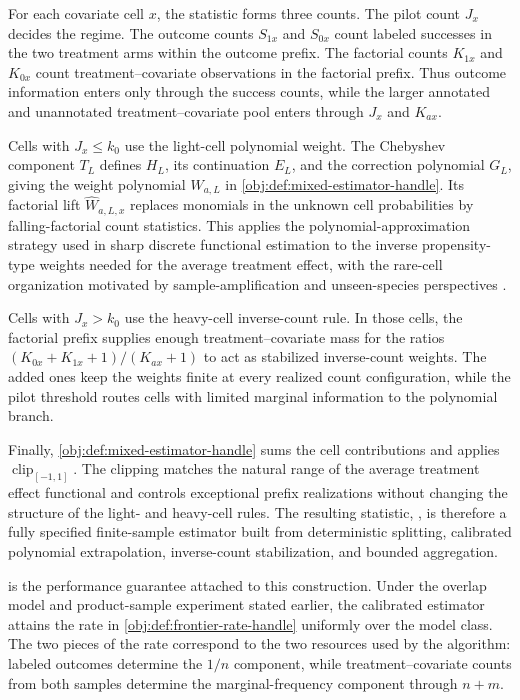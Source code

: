 For each covariate cell \(x\), the statistic forms three counts. The pilot count \(J_x\) decides the regime. The outcome counts \(S_{1x}\) and \(S_{0x}\) count labeled successes in the two treatment arms within the outcome prefix. The factorial counts \(K_{1x}\) and \(K_{0x}\) count treatment--covariate observations in the factorial prefix. Thus outcome information enters only through the success counts, while the larger annotated and unannotated treatment--covariate pool enters through \(J_x\) and \(K_{ax}\).

Cells with \(J_x\le k_0\) use the light-cell polynomial weight. The Chebyshev component \(T_L\) defines \(H_L\), its continuation \(E_L\), and the correction polynomial \(G_L\), giving the weight polynomial \(W_{a,L}\) in \cref{obj:def:mixed-estimator-handle}. Its factorial lift \(\widehat W_{a,L,x}\) replaces monomials in the unknown cell probabilities by falling-factorial count statistics. This applies the polynomial-approximation strategy used in sharp discrete functional estimation \citep{JiaoVenkatHanWeissman2015,WuYang2016} to the inverse propensity-type weights needed for the average treatment effect, with the rare-cell organization motivated by sample-amplification and unseen-species perspectives \citep{ValiantValiant2017,OrlitskySureshWu2016}.

Cells with \(J_x>k_0\) use the heavy-cell inverse-count rule. In those cells, the factorial prefix supplies enough treatment--covariate mass for the ratios \((K_{0x}+K_{1x}+1)/(K_{ax}+1)\) to act as stabilized inverse-count weights. The added ones keep the weights finite at every realized count configuration, while the pilot threshold routes cells with limited marginal information to the polynomial branch.

Finally, \cref{obj:def:mixed-estimator-handle} sums the cell contributions and applies \(\operatorname{clip}_{[-1,1]}\). The clipping matches the natural range of the average treatment effect functional and controls exceptional prefix realizations without changing the structure of the light- and heavy-cell rules. The resulting statistic, , is therefore a fully specified finite-sample estimator built from deterministic splitting, calibrated polynomial extrapolation, inverse-count stabilization, and bounded aggregation.

 is the performance guarantee attached to this construction. Under the overlap model and product-sample experiment stated earlier, the calibrated estimator attains the rate in \cref{obj:def:frontier-rate-handle} uniformly over the model class. The two pieces of the rate correspond to the two resources used by the algorithm: labeled outcomes determine the \(1/n\) component, while treatment--covariate counts from both samples determine the marginal-frequency component through \(n+m\).

